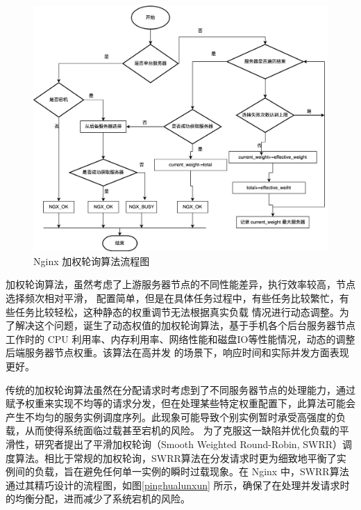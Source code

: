 \begin{figure}[htb]
  \centering
  \includegraphics[width=\textwidth]{figures/round-flowchart.png}
  \caption{Nginx 加权轮询算法流程图}
  \label{weight_round}
\end{figure}

加权轮询算法，虽然考虑了上游服务器节点的不同性能差异，执行效率较高，节点选择频次相对平滑，
配置简单，但是在具体任务过程中，有些任务比较繁忙，有些任务比较轻松，这种静态的权重调节无法根据真实负载
情况进行动态调整。为了解决这个问题，诞生了动态权值的加权轮询算法，基于手机各个后台服务器节点工作时的 CPU
利用率、内存利用率、网络性能和磁盘IO等性能情况，动态的调整后端服务器节点权重\cite{谭畅2021云中心基于}。该算法在高并发
的场景下，响应时间和实际并发方面表现更好。

传统的加权轮询算法虽然在分配请求时考虑到了不同服务器节点的处理能力，通过赋予权重来实现不均等的请求分发，但在处理某些特定权重配置下，此算法可能会产生不均匀的服务实例调度序列。此现象可能导致个别实例暂时承受高强度的负载，从而使得系统面临过载甚至宕机的风险。
为了克服这一缺陷并优化负载的平滑性，研究者提出了平滑加权轮询（Smooth Weighted Round-Robin, SWRR）调度算法。相比于常规的加权轮询，SWRR算法在分发请求时更为细致地平衡了实例间的负载，旨在避免任何单一实例的瞬时过载现象。在 Nginx 中，SWRR算法通过其精巧设计的流程图，如图\ref{pinghualunxun} 所示，确保了在处理并发请求时的均衡分配，进而减少了系统宕机的风险。


